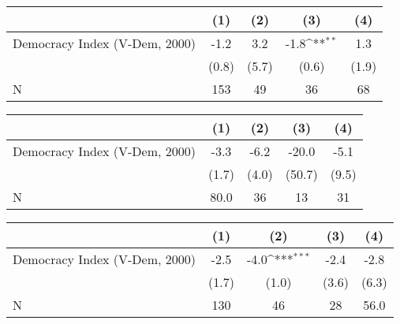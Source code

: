 {
\def\sym#1{\ifmmode^{#1}\else\(^{#1}\)\fi}
\begin{tabular}{l*{4}{c}}
\hline\hline
                    &\multicolumn{1}{c}{(1)}         &\multicolumn{1}{c}{(2)}         &\multicolumn{1}{c}{(3)}         &\multicolumn{1}{c}{(4)}         \\
\hline
Democracy Index (V-Dem, 2000)&        -1.2         &         3.2         &        -1.8\sym{**} &         1.3         \\
                    &       (0.8)         &       (5.7)         &       (0.6)         &       (1.9)         \\
\hline
N                   &         153         &          49         &          36         &          68         \\
\hline\hline
\end{tabular}
}
{
\def\sym#1{\ifmmode^{#1}\else\(^{#1}\)\fi}
\begin{tabular}{l*{4}{c}}
\hline\hline
                    &\multicolumn{1}{c}{(1)}         &\multicolumn{1}{c}{(2)}         &\multicolumn{1}{c}{(3)}         &\multicolumn{1}{c}{(4)}         \\
\hline
Democracy Index (V-Dem, 2000)&        -3.3         &        -6.2         &       -20.0         &        -5.1         \\
                    &       (1.7)         &       (4.0)         &      (50.7)         &       (9.5)         \\
\hline
N                   &        80.0         &          36         &          13         &          31         \\
\hline\hline
\end{tabular}
}
{
\def\sym#1{\ifmmode^{#1}\else\(^{#1}\)\fi}
\begin{tabular}{l*{4}{c}}
\hline\hline
                    &\multicolumn{1}{c}{(1)}         &\multicolumn{1}{c}{(2)}         &\multicolumn{1}{c}{(3)}         &\multicolumn{1}{c}{(4)}         \\
\hline
Democracy Index (V-Dem, 2000)&        -2.5         &        -4.0\sym{***}&        -2.4         &        -2.8         \\
                    &       (1.7)         &       (1.0)         &       (3.6)         &       (6.3)         \\
\hline
N                   &         130         &          46         &          28         &        56.0         \\
\hline\hline
\end{tabular}
}
